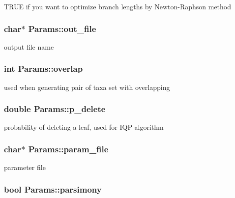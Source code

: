 \label{structParams_acd0efde7ff44948e3193e1e248866e8b}
TRUE if you want to optimize branch lengths by Newton-\/Raphson method \hypertarget{structParams_a85c096289839853f35830aacc504e054}{
\subsubsection[{out\_\-file}]{\setlength{\rightskip}{0pt plus 5cm}char$\ast$ {\bf Params::out\_\-file}}}
\label{structParams_a85c096289839853f35830aacc504e054}
output file name \hypertarget{structParams_af327f4f532c8cf4ec6867ccfbdc5fc9e}{
\subsubsection[{overlap}]{\setlength{\rightskip}{0pt plus 5cm}int {\bf Params::overlap}}}
\label{structParams_af327f4f532c8cf4ec6867ccfbdc5fc9e}
used when generating pair of taxa set with overlapping \hypertarget{structParams_a5f2181d954439ef8c43fb9f6dd07139b}{
\subsubsection[{p\_\-delete}]{\setlength{\rightskip}{0pt plus 5cm}double {\bf Params::p\_\-delete}}}
\label{structParams_a5f2181d954439ef8c43fb9f6dd07139b}
probability of deleting a leaf, used for IQP algorithm \hypertarget{structParams_a24504739447edd1580288dd460179eba}{
\subsubsection[{param\_\-file}]{\setlength{\rightskip}{0pt plus 5cm}char$\ast$ {\bf Params::param\_\-file}}}
\label{structParams_a24504739447edd1580288dd460179eba}
parameter file \hypertarget{structParams_a1e66dd646d24a63748e593eba27d17ce}{
\subsubsection[{parsimony}]{\setlength{\rightskip}{0pt plus 5cm}bool {\bf Params::parsimony}}}
\label{structParams_a1e66dd646d24a63748e593eba27d17ce}
